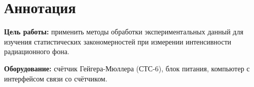 \section{Аннотация}
\textbf{Цель работы:} применить методы обработки экспериментальных данный для
изучения статистических закономерностей при измерении интенсивности радиационного фона.

\textbf{Оборудование:} счётчик Гейгера-Мюллера (СТС-6), блок питания,
компьютер с интерфейсом связи со счётчиком.
